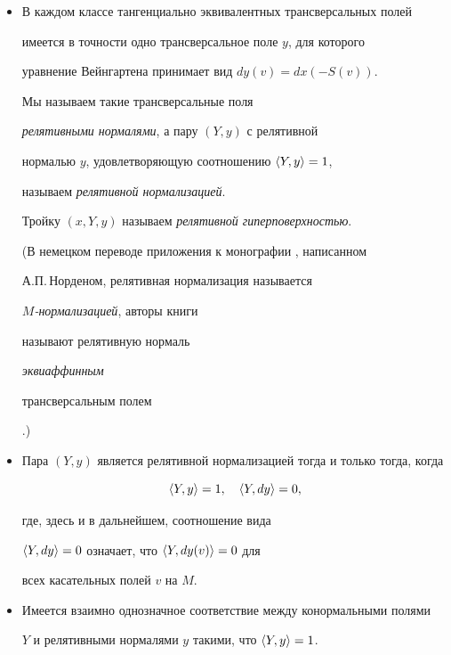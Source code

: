 \begin{itemize}


\item[(i)]


В каждом классе тангенциально эквивалентных трансверсальных полей


имеется в точности одно трансверсальное поле $y$, для которого


уравнение Вейнгартена принимает вид $dy(v) = dx(-S(v))$.


Мы называем такие трансверсальные поля


{\it релятивными нормалями}, а пару $(Y,y)$ с релятивной


нормалью $y$, удовлетворяющую соотношению $\langle Y,y\rangle=1$,


называем {\it релятивной нормализацией}.


Тройку $(x,Y,y)$ называем {\it релятивной гиперповерхностью}.


(В немецком переводе приложения к монографии \cite{SCHI}, написанном


А.П.\,Норденом, релятивная нормализация называется


{\it $M$-нормализацией}, авторы книги


\cite{NOM-SA} называют релятивную нормаль {\it эквиаффинным


трансверсальным полем}.)





\item[(ii)]


Пара $(Y,y)$ является релятивной нормализацией тогда и только тогда, когда


$$


\la Y,y\ra =1, \quad \la Y,dy\ra=0,


$$


где, здесь и в дальнейшем, соотношение вида


$\langle Y,dy\rangle=0$ означает, что $\langle Y,dy(v)\rangle=0$ для


всех касательных полей $v$ на $M$.





\item[(iii)]


Имеется взаимно однозначное соответствие между конормальными полями


$Y$ и релятивными нормалями $y$ такими, что $\langle Y,y\rangle =1$.






\end{itemize}
